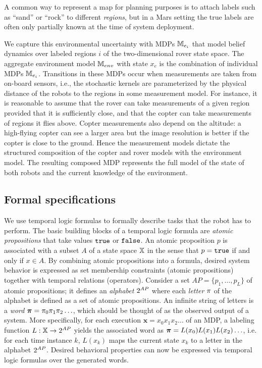 \documentclass[conference]{IEEEtran}
\begin{document}
\smallskip
{}  
A common way to represent a map for planning purposes is to attach labels such as ``sand'' or ``rock'' to different \emph{regions}, but in a Mars setting the true labels are often only partially known at the time of system deployment. 

We capture this environmental uncertainty with MDPs $\mathbb{M}_{e_i}$ that model belief dynamics over labeled regions $i$ of the two-dimensional rover state space. The aggregate environment model $\mathbb{M}_{env}$ with state $x_e$ is the combination of individual MDPs $\mathbb{M}_{e_i}$. Transitions in these MDPs occur when measurements are taken from on-board sensors, i.e., the stochastic kernels are parameterized by the physical distance of the robots to the regions in some measurement model. For instance, it is reasonable to assume that the rover can take measurements of a given region provided that it is sufficiently close, and that the copter can take measurements of regions it flies above. Copter measurements also depend on the altitude: a high-flying copter can see a larger area but the image resolution is better if the copter is close to the ground. Hence the measurement models dictate the structured composition of the copter and rover models with the environment model. The resulting composed MDP represents the full model of the state of both robots and the current knowledge of the environment.

\subsection{Formal specifications}
We use temporal logic formulas to formally describe tasks that the robot has to perform.
The basic building blocks of a temporal logic formula are \emph{atomic propositions} that take values $\texttt{true}$ or $\texttt{false}$.  An atomic proposition $p$ is associated with a subset $A$ of a state space $\mathbb{X}$ in the sense that $p = \texttt{true}$ if and only if $x \in A$. 
By combining atomic propositions into a formula, desired system behavior is expressed as set membership constraints (atomic propositions) together with temporal relations (operators). Consider a set $AP = \{ p_1, \ldots, p_L \}$ of atomic propositions; it defines an \emph{alphabet} ${2^{AP}}$ where each \emph{letter} $\pi$ of the alphabet is defined as a set of atomic propositions. An infinite string of letters is a \emph{word} $\boldsymbol{\pi}=\pi_0\pi_1\pi_2\ldots$, which should be thought of as the observed output of a system. More specifically, for each execution $\mathbf{x} = x_0 x_1 x_2 \ldots$ of an MDP, a
labeling function $L: \mathbb{X} \rightarrow {2^{AP}}$ yields the associated word as $\boldsymbol{\pi} = L(x_0)L(x_1) L(x_2) \ldots$, i.e. for each time instance $k$, $L(x_k)$ maps the current state $x_k$ to a letter in the alphabet ${2^{AP}}$. Desired behavioral properties can now be expressed via temporal logic formulas over the generated words.
\end{document}
